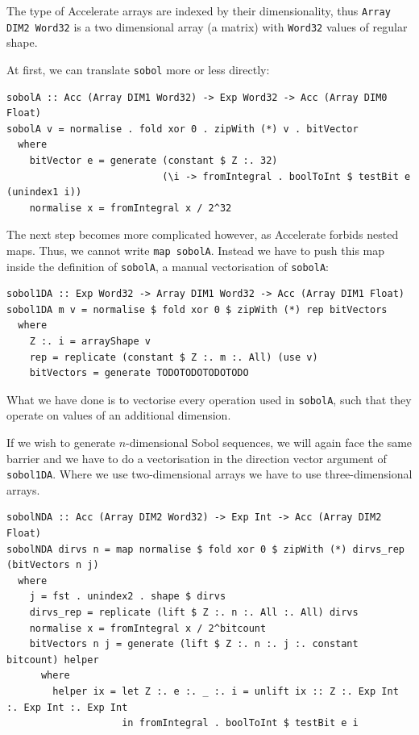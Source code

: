 \documentclass[preprint]{sigplanconf}
\begin{document}
The type of Accelerate arrays are indexed by their dimensionality,
thus \verb|Array DIM2 Word32| is a two dimensional array (a matrix)
with \verb|Word32| values of regular shape. 

At first, we can translate \verb|sobol| more or less directly:
\begin{verbatim}
sobolA :: Acc (Array DIM1 Word32) -> Exp Word32 -> Acc (Array DIM0 Float)
sobolA v = normalise . fold xor 0 . zipWith (*) v . bitVector
  where
    bitVector e = generate (constant $ Z :. 32)
                           (\i -> fromIntegral . boolToInt $ testBit e (unindex1 i))
    normalise x = fromIntegral x / 2^32
\end{verbatim}

The next step becomes more complicated however, as Accelerate forbids
nested maps. Thus, we cannot write \verb|map sobolA|.
Instead we have to push this map inside the definition of
\verb|sobolA|, a manual vectorisation of \verb|sobolA|:
\begin{verbatim}
sobol1DA :: Exp Word32 -> Array DIM1 Word32 -> Acc (Array DIM1 Float)
sobol1DA m v = normalise $ fold xor 0 $ zipWith (*) rep bitVectors
  where
    Z :. i = arrayShape v
    rep = replicate (constant $ Z :. m :. All) (use v)
    bitVectors = generate TODOTODOTODOTODO
\end{verbatim}
What we have done is to vectorise every operation used in
\verb|sobolA|, such that they operate on values of an additional
dimension.

If we wish to generate $n$-dimensional Sobol sequences, we will again
face the same barrier and we have to do a vectorisation in the
direction vector argument of \verb|sobol1DA|. Where we use
two-dimensional arrays we have to use three-dimensional arrays. %

\begin{verbatim}
sobolNDA :: Acc (Array DIM2 Word32) -> Exp Int -> Acc (Array DIM2 Float)
sobolNDA dirvs n = map normalise $ fold xor 0 $ zipWith (*) dirvs_rep (bitVectors n j)
  where
    j = fst . unindex2 . shape $ dirvs
    dirvs_rep = replicate (lift $ Z :. n :. All :. All) dirvs
    normalise x = fromIntegral x / 2^bitcount
    bitVectors n j = generate (lift $ Z :. n :. j :. constant bitcount) helper
      where
        helper ix = let Z :. e :. _ :. i = unlift ix :: Z :. Exp Int :. Exp Int :. Exp Int
                    in fromIntegral . boolToInt $ testBit e i
\end{verbatim}
\end{document}
